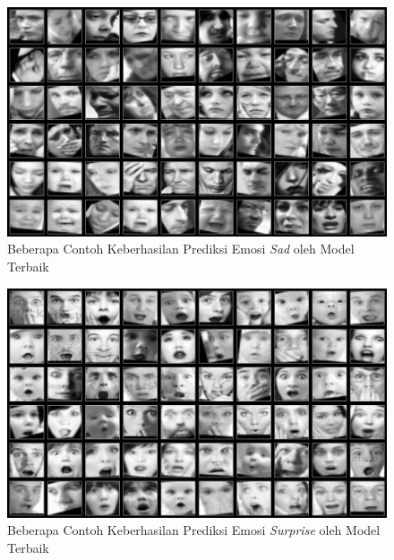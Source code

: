 \begin{figure}[!t]
    \centering
    \includegraphics[width=14cm]{gambar/contoh_hasil_prediksi_true_sad.png}
    \caption{Beberapa Contoh Keberhasilan Prediksi Emosi \textit{Sad} oleh Model Terbaik}
    \label{fig:hasilprediksitrue4}
\end{figure}

\begin{figure}[!t]
    \centering
    \includegraphics[width=14cm]{gambar/contoh_hasil_prediksi_true_surprise.png}
    \caption{Beberapa Contoh Keberhasilan Prediksi Emosi \textit{Surprise} oleh Model Terbaik}
    \label{fig:hasilprediksitrue5}
\end{figure}

